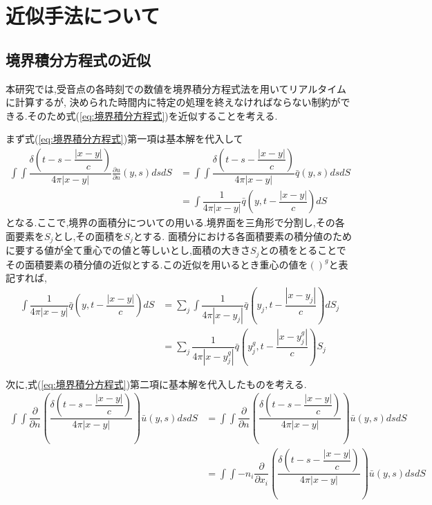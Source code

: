 \documentclass[dvipdfmx]{ampbt}
\begin{document}
\section{近似手法について}
\subsection{境界積分方程式の近似}
\label{kinji}
本研究では,受音点の各時刻での数値を境界積分方程式法を用いてリアルタイムに計算するが,%
決められた時間内に特定の処理を終えなければならない制約ができる.そのため式(\ref{eq:境界積分方程式})を近似することを考える.\par
まず式(\ref{eq:境界積分方程式})第一項は基本解を代入して
\begin{align}
\int\!\!\!\int \dfrac{\delta(t-s-\dfrac{|x-y|}{c})}{4\pi|x-y|} \frac{\partial u}{\partial n}(y,s)dsdS
&= \int\!\!\!\int \dfrac{\delta(t-s-\dfrac{|x-y|}{c})}{4\pi|x-y|} \bar{q}(y,s)dsdS\\
&= \int\!\!\! \dfrac{1}{4\pi|x-y|} \bar{q}(y,t-\dfrac{|x-y|}{c})dS
\end{align}
となる.ここで,境界の面積分についての用いる.境界面を三角形で分割し,その各面要素を$S_j$とし,その面積を$S_j$とする.
面積分における各面積要素の積分値のために要する値が全て重心での値と等しいとし,面積の大きさ$S_j$との積をとることで
その面積要素の積分値の近似とする.この近似を用いるとき重心の値を$( )^g$と表記すれば,
\begin{align}
\int\!\!\! \dfrac{1}{4\pi|x-y|} \bar{q}(y,t-\dfrac{|x-y|}{c})dS &= \sum_j \int\!\!\! \dfrac{1}{4\pi|x-y_j|} \bar{q}(y_j,t-\dfrac{|x-y_j|}{c})dS_j \nonumber \\
&=\sum_j \dfrac{1}{4\pi|x-y_j^g|} \bar{q}(y_j^g,t-\dfrac{|x-y_j^g|}{c})S_j
\end{align}
\par
次に,式(\ref{eq:境界積分方程式})第二項に基本解を代入したものを考える.
\begin{align}
\int\!\!\!\int \dfrac{\partial}{\partial n}\left( \dfrac{\delta(t-s-\dfrac{|x-y|}{c})}{4\pi|x-y|} \right) \bar{u}(y,s) ds dS
&= \int\!\!\!\int \dfrac{\partial}{\partial n}\left( \dfrac{\delta(t-s-\dfrac{|x-y|}{c})}{4\pi|x-y|} \right) \bar{u}(y,s) ds dS \nonumber \\
&= \int\!\!\!\int -n_i\dfrac{\partial}{\partial x_i}\left( \dfrac{\delta(t-s-\dfrac{|x-y|}{c})}{4\pi|x-y|} \right) \bar{u}(y,s) ds dS
\end{align}
\end{document}
